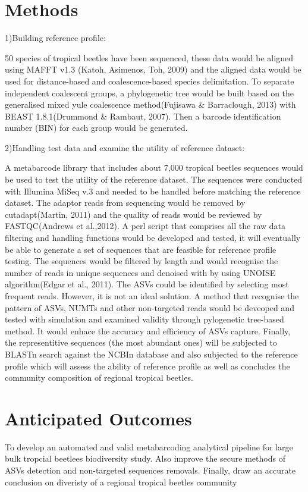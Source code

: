 \documentclass[11pt, a4paper]{article}
\begin{document}
\section*{Methods}
1)Building reference profile:

50 species of tropical beetles have been sequenced, these data would be aligned using MAFFT v1.3 (Katoh, Asimenos, Toh, 2009) and the aligned data would be used  for distance-based and coalescence-based species delimitation. To separate independent coalescent groups, a phylogenetic tree would be built based on the generalised mixed yule coalescence method(Fujisawa & Barraclough, 2013) with BEAST 1.8.1(Drummond & Rambaut, 2007). Then a barcode identification number (BIN) for each group would be generated.  

\vspace{0.5\baselineskip} %

2)Handling test data and examine the utility of reference dataset:

A metabarcode library that includes about 7,000 tropical beetles sequences would be  used to test the utility of the reference dataset. The sequences were conducted with Illumina MiSeq v.3 and needed to be handled before matching the reference dataset. The adaptor reads from sequencing would be removed by cutadapt(Martin, 2011) and the quality of reads would be reviewed by FASTQC(Andrews et al.,2012). A perl script that comprises all the raw data filtering and handling functions would be developed and tested, it will eventually be able to generate a set of sequences that are feasible for reference profile testing.
The sequences would be filtered by length and would recognise the number of reads in unique sequences and denoised with by using UNOISE algorithm(Edgar et al., 2011). The ASVs could be identified by selecting most frequent reads. However, it is not an ideal solution. A method that recognise the pattern of ASVs, NUMTs and other non-targeted reads would be deveoped and tested  with simulation and examined validity through pylogenetic tree-based method. It would enhace the accuracy and efficiency of ASVs capture.
Finally, the representitive sequences (the most abundant ones) will be subjected to BLASTn search against the NCBIn database and also subjected to the reference profile which will assess the ability of reference profile as well as concludes the community composition of regional tropical beetles.

\section*{Anticipated Outcomes}
To develop an automated and valid metabarcoding analytical pipeline for large bulk tropcial beetlees biodiversity study. Also improve the secure methods of ASVs detection and non-targeted sequences removals. Finally, draw an accurate conclusion on diveristy of a regional tropical beetles community
\end{document}

